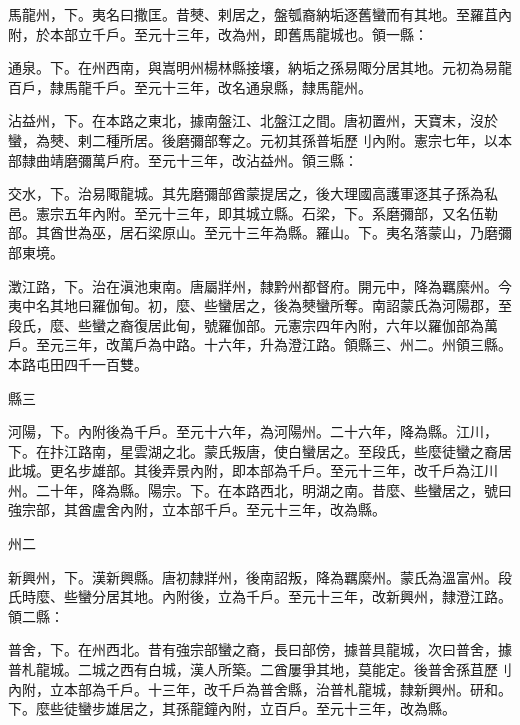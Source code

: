 \begin{pinyinscope}
 馬龍州，下。夷名曰撒匡。昔僰、剌居之，盤瓠裔納垢逐舊蠻而有其地。至羅苴內附，於本部立千戶。至元十三年，改為州，即舊馬龍城也。領一縣：



 通泉。下。在州西南，與嵩明州楊林縣接壤，納垢之孫易陬分居其地。元初為易龍百戶，隸馬龍千戶。至元十三年，改名通泉縣，隸馬龍州。



 沾益州，下。在本路之東北，據南盤江、北盤江之間。唐初置州，天寶末，沒於蠻，為僰、剌二種所居。後磨彌部奪之。元初其孫普垢歷刂內附。憲宗七年，以本部隸曲靖磨彌萬戶府。至元十三年，改沾益州。領三縣：



 交水，下。治易陬龍城。其先磨彌部酋蒙提居之，後大理國高護軍逐其子孫為私邑。憲宗五年內附。至元十三年，即其城立縣。石梁，下。系磨彌部，又名伍勒部。其酋世為巫，居石梁原山。至元十三年為縣。羅山。下。夷名落蒙山，乃磨彌部東境。



 澂江路，下。治在滇池東南。唐屬牂州，隸黔州都督府。開元中，降為羈縻州。今夷中名其地曰羅伽甸。初，麼、些蠻居之，後為僰蠻所奪。南詔蒙氏為河陽郡，至段氏，麼、些蠻之裔復居此甸，號羅伽部。元憲宗四年內附，六年以羅伽部為萬戶。至元三年，改萬戶為中路。十六年，升為澄江路。領縣三、州二。州領三縣。本路屯田四千一百雙。



 縣三



 河陽，下。內附後為千戶。至元十六年，為河陽州。二十六年，降為縣。江川，下。在抃江路南，星雲湖之北。蒙氏叛唐，使白蠻居之。至段氏，些麼徒蠻之裔居此城。更名步雄部。其後弄景內附，即本部為千戶。至元十三年，改千戶為江川州。二十年，降為縣。陽宗。下。在本路西北，明湖之南。昔麼、些蠻居之，號曰強宗部，其酋盧舍內附，立本部千戶。至元十三年，改為縣。



 州二



 新興州，下。漢新興縣。唐初隸牂州，後南詔叛，降為羈縻州。蒙氏為溫富州。段氏時麼、些蠻分居其地。內附後，立為千戶。至元十三年，改新興州，隸澄江路。領二縣：



 普舍，下。在州西北。昔有強宗部蠻之裔，長曰部傍，據普具龍城，次曰普舍，據普札龍城。二城之西有白城，漢人所築。二酋屢爭其地，莫能定。後普舍孫苴歷刂內附，立本部為千戶。十三年，改千戶為普舍縣，治普札龍城，隸新興州。研和。下。麼些徒蠻步雄居之，其孫龍鐘內附，立百戶。至元十三年，改為縣。




\end{pinyinscope}
